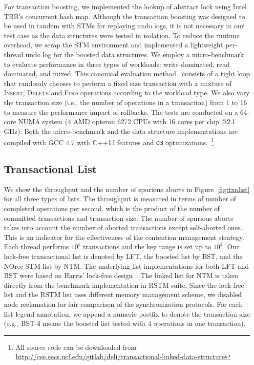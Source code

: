 \documentclass[]{sig-alternate-05-2015}
\begin{document}
For transaction boosting, we implemented the lookup of abstract lock using Intel TBB's concurrent hash map.
Although the transaction boosting was designed to be used in tandem with STMs for replaying undo logs, it is not necessary in our test case as the data structures were tested in isolation.
To reduce the runtime overhead, we scrap the STM environment and implemented a lightweight per-thread undo log for the boosted data structures.
We employ a micro-benchmark to evaluate performance in three types of workloads: write dominated, read dominated, and mixed.
This canonical evaluation method~\cite{dalessandro2010norec,harris2001pragmatic} consists of a tight loop that randomly chooses to perform a fixed size transaction with a mixture of \textsc{Insert}, \textsc{Delete} and \textsc{Find} operations according to the workload type.
We also vary the transaction size (i.e., the number of operations in a transaction) from 1 to 16 to measure the performance impact of rollbacks.
The tests are conducted on a 64-core NUMA system (4 AMD opteron 6272 CPUs with 16 cores per chip @2.1 GHz). 
Both the micro-benchmark and the data structure implementations are compiled with GCC 4.7 with C++11 features and \texttt{O3} optimizations.~\footnote{All source code can be downloaded from \url{http://cse.eecs.ucf.edu/gitlab/deli/transactional-linked-data-structure}}


\subsection{Transactional List}
\label{sec:txnlistexp}
We show the throughput and the number of spurious aborts in Figure~\ref{fig:txnlist} for all three types of lists.
The throughput is measured in terms of number of completed operations per second, which is the product of the number of committed transactions and transaction size.
The number of spurious aborts takes into account the number of aborted transactions except self-aborted ones.
This is an indicator for the effectiveness of the contention management strategy.
Each thread performs $10^5$ transactions and the key range is set up to $10^4$.
Our lock-free transactional list is denoted by LFT, the boosted list by BST, and the NOrec STM list by NTM. 
The underlying list implementations for both LFT and BST were based on Harris' lock-free design~\cite{harris2001pragmatic}.
The linked list for NTM is taken directly from the benchmark implementation in RSTM suite.
Since the lock-free list and the RSTM list uses different memory management scheme, we disabled node reclamation for fair comparison of the synchronization protocols.
For each list legend annotation, we append a numeric postfix to denote the transaction size (e.g., BST-4 means the boosted list tested with 4 operations in one transaction). 
\end{document}
